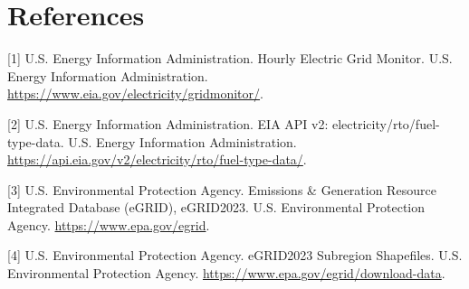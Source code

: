 \documentclass{article}
\begin{document}
\section*{References}

\medskip

{
\small

[1] U.S. Energy Information Administration. Hourly Electric Grid Monitor. U.S.
Energy Information Administration. \url{https://www.eia.gov/electricity/gridmonitor/}.

[2] U.S. Energy Information Administration. EIA API v2: electricity/rto/fuel-type-data.
U.S. Energy Information Administration.
\url{https://api.eia.gov/v2/electricity/rto/fuel-type-data/}.

[3] U.S. Environmental Protection Agency. Emissions \& Generation Resource
Integrated Database (eGRID), eGRID2023. U.S. Environmental Protection Agency.
\url{https://www.epa.gov/egrid}.

[4] U.S. Environmental Protection Agency. eGRID2023 Subregion Shapefiles. U.S.
Environmental Protection Agency. \url{https://www.epa.gov/egrid/download-data}.

}
\end{document}
